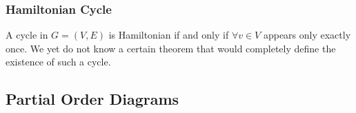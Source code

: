 \documentclass[a4paper]{article}
\theoremstyle{plain}
\theoremstyle{definition}
\newtheorem{defn}{Definition}[section]
\theoremstyle{remark}
\begin{document}
\subsubsection{Hamiltonian Cycle}
\begin{tcolorbox}[colback=black!3!white,colframe=black!60!white,title=\begin{defn}Hamiltonian Cycles \label{Hamiltonian Cycles}\end{defn}]
A cycle in $G= (V,E)$ is Hamiltonian if and only if $\forall v \in V$ appears only exactly once. We yet do not know a certain theorem that would completely define the existence of such a cycle. 
\end{tcolorbox}
\subsection{Partial Order Diagrams}
\end{document}
